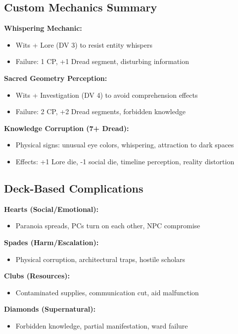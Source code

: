 \documentclass[11pt]{article}
\begin{document}
\subsection*{Custom Mechanics Summary}

\textbf{Whispering Mechanic:}
\begin{itemize}
\item Wits + Lore (DV 3) to resist entity whispers
\item Failure: 1 CP, +1 Dread segment, disturbing information
\end{itemize}

\textbf{Sacred Geometry Perception:}
\begin{itemize}
\item Wits + Investigation (DV 4) to avoid comprehension effects
\item Failure: 2 CP, +2 Dread segments, forbidden knowledge
\end{itemize}

\textbf{Knowledge Corruption (7+ Dread):}
\begin{itemize}
\item Physical signs: unusual eye colors, whispering, attraction to dark spaces
\item Effects: +1 Lore die, -1 social die, timeline perception, reality distortion
\end{itemize}

\subsection*{Deck-Based Complications}

\textbf{Hearts (Social/Emotional):}
\begin{itemize}
\item Paranoia spreads, PCs turn on each other, NPC compromise
\end{itemize}

\textbf{Spades (Harm/Escalation):}
\begin{itemize}
\item Physical corruption, architectural traps, hostile scholars
\end{itemize}

\textbf{Clubs (Resources):}
\begin{itemize}
\item Contaminated supplies, communication cut, aid malfunction
\end{itemize}

\textbf{Diamonds (Supernatural):}
\begin{itemize}
\item Forbidden knowledge, partial manifestation, ward failure
\end{itemize}
\end{document}
